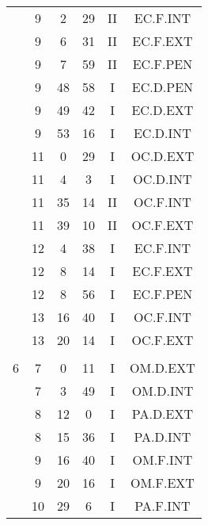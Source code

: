 \documentclass[12pt, a4paper]{article}
\begin{document}
\begin{multicols}{3}
{\begin{tabular}{c c c c c c}
	 	 	 	 & 9 & 2 & 29 & II & EC.F.INT\\%
	 	 	 	 & 9 & 6 & 31 & II & EC.F.EXT\\%
	 	 	 	 & 9 & 7 & 59 & II & EC.F.PEN\\%
	 	 	 	 & 9 & 48 & 58 & I & EC.D.PEN\\%
	 	 	 	 & 9 & 49 & 42 & I & EC.D.EXT\\%
	 	 	 	 & 9 & 53 & 16 & I & EC.D.INT\\%
	 	 	 	 & 11 & 0 & 29 & I & OC.D.EXT\\%
	 	 	 	 & 11 & 4 & 3 & I & OC.D.INT\\%
	 	 	 	 & 11 & 35 & 14 & II & OC.F.INT\\%
	 	 	 	 & 11 & 39 & 10 & II & OC.F.EXT\\%
	 	 	 	 & 12 & 4 & 38 & I & EC.F.INT\\%
	 	 	 	 & 12 & 8 & 14 & I & EC.F.EXT\\%
	 	 	 	 & 12 & 8 & 56 & I & EC.F.PEN\\%
	 	 	 	 & 13 & 16 & 40 & I & OC.F.INT\\%
	 	 	 	 & 13 & 20 & 14 & I & OC.F.EXT\\%
	 	 	 	 & & & & & \\%
	 	 	 	6 & 7 & 0 & 11 & I & OM.D.EXT\\%
	 	 	 	 & 7 & 3 & 49 & I & OM.D.INT\\%
	 	 	 	 & 8 & 12 & 0 & I & PA.D.EXT\\%
	 	 	 	 & 8 & 15 & 36 & I & PA.D.INT\\%
	 	 	 	 & 9 & 16 & 40 & I & OM.F.INT\\%
	 	 	 	 & 9 & 20 & 16 & I & OM.F.EXT\\%
	 	 	 	 & 10 & 29 & 6 & I & PA.F.INT\\%

\end{tabular}}
\end{multicols}
\end{document}
